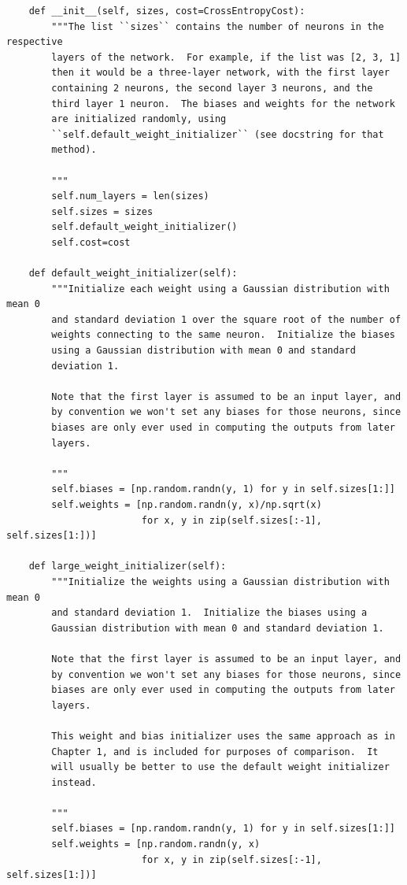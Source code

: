 \begin{lstlisting}
    def __init__(self, sizes, cost=CrossEntropyCost):
        """The list ``sizes`` contains the number of neurons in the respective
        layers of the network.  For example, if the list was [2, 3, 1]
        then it would be a three-layer network, with the first layer
        containing 2 neurons, the second layer 3 neurons, and the
        third layer 1 neuron.  The biases and weights for the network
        are initialized randomly, using
        ``self.default_weight_initializer`` (see docstring for that
        method).

        """
        self.num_layers = len(sizes)
        self.sizes = sizes
        self.default_weight_initializer()
        self.cost=cost

    def default_weight_initializer(self):
        """Initialize each weight using a Gaussian distribution with mean 0
        and standard deviation 1 over the square root of the number of
        weights connecting to the same neuron.  Initialize the biases
        using a Gaussian distribution with mean 0 and standard
        deviation 1.

        Note that the first layer is assumed to be an input layer, and
        by convention we won't set any biases for those neurons, since
        biases are only ever used in computing the outputs from later
        layers.

        """
        self.biases = [np.random.randn(y, 1) for y in self.sizes[1:]]
        self.weights = [np.random.randn(y, x)/np.sqrt(x)
                        for x, y in zip(self.sizes[:-1], self.sizes[1:])]

    def large_weight_initializer(self):
        """Initialize the weights using a Gaussian distribution with mean 0
        and standard deviation 1.  Initialize the biases using a
        Gaussian distribution with mean 0 and standard deviation 1.

        Note that the first layer is assumed to be an input layer, and
        by convention we won't set any biases for those neurons, since
        biases are only ever used in computing the outputs from later
        layers.

        This weight and bias initializer uses the same approach as in
        Chapter 1, and is included for purposes of comparison.  It
        will usually be better to use the default weight initializer
        instead.

        """
        self.biases = [np.random.randn(y, 1) for y in self.sizes[1:]]
        self.weights = [np.random.randn(y, x)
                        for x, y in zip(self.sizes[:-1], self.sizes[1:])]


\end{lstlisting}
